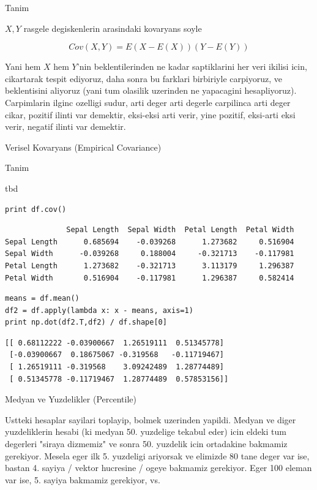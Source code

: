 \documentclass[12pt,fleqn]{article}\usepackage{../common}
\begin{document}
Tanim

$X,Y$ rasgele degiskenlerin arasindaki kovaryans soyle

$$ Cov(X,Y) = E(X-E(X))(Y-E(Y)) $$

Yani hem $X$ hem $Y$'nin beklentilerinden ne kadar saptiklarini her veri
ikilisi icin, cikartarak tespit ediyoruz, daha sonra bu farklari birbiriyle
carpiyoruz, ve beklentisini aliyoruz (yani tum olasilik uzerinden ne
yapacagini hesapliyoruz). Carpimlarin ilginc ozelligi sudur, arti deger
arti degerle carpilinca arti deger cikar, pozitif ilinti var demektir,
eksi-eksi arti verir, yine pozitif, eksi-arti eksi verir, negatif ilinti
var demektir.

Verisel Kovaryans (Empirical Covariance) 

Tanim

tbd

\begin{verbatim}
print df.cov()
\end{verbatim}

\begin{verbatim}
              Sepal Length  Sepal Width  Petal Length  Petal Width
Sepal Length      0.685694    -0.039268      1.273682     0.516904
Sepal Width      -0.039268     0.188004     -0.321713    -0.117981
Petal Length      1.273682    -0.321713      3.113179     1.296387
Petal Width       0.516904    -0.117981      1.296387     0.582414
\end{verbatim}

\begin{verbatim}
means = df.mean()
df2 = df.apply(lambda x: x - means, axis=1)
print np.dot(df2.T,df2) / df.shape[0]
\end{verbatim}

\begin{verbatim}
[[ 0.68112222 -0.03900667  1.26519111  0.51345778]
 [-0.03900667  0.18675067 -0.319568   -0.11719467]
 [ 1.26519111 -0.319568    3.09242489  1.28774489]
 [ 0.51345778 -0.11719467  1.28774489  0.57853156]]
\end{verbatim}

Medyan ve Yuzdelikler (Percentile)

Ustteki hesaplar sayilari toplayip, bolmek uzerinden yapildi. Medyan
ve diger yuzdeliklerin hesabi (ki medyan 50. yuzdelige tekabul eder)
icin eldeki tum degerleri "siraya dizmemiz" ve sonra 50. yuzdelik icin
ortadakine bakmamiz gerekiyor. Mesela eger ilk 5. yuzdeligi ariyorsak
ve elimizde 80 tane deger var ise, bastan 4. sayiya / vektor hucresine
/ ogeye bakmamiz gerekiyor. Eger 100 eleman var ise, 5. sayiya
bakmamiz gerekiyor, vs.
\end{document}
